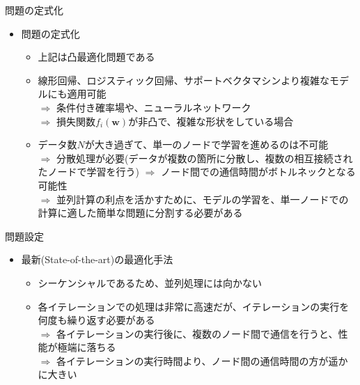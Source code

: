 \documentclass[dvipdfmx,notheorems,t]{beamer}
\begin{document}
\begin{frame}{問題の定式化}

\begin{itemize}
	\item 問題の定式化
	\begin{itemize}
		\item 上記は凸最適化問題である
		\newline
		
		\item 線形回帰、ロジスティック回帰、サポートベクタマシンより複雑なモデルにも適用可能 \\
		$\Rightarrow$ 条件付き確率場や、ニューラルネットワーク \\
		$\Rightarrow$ 損失関数$f_i(\bm{w})$が非凸で、複雑な形状をしている場合
		\newline
		
		\item データ数$N$が大き過ぎて、単一のノードで学習を進めるのは不可能 \\
		$\Rightarrow$ 分散処理が必要(データが複数の箇所に分散し、複数の相互接続されたノードで学習を行う) \newline \newline
		$\Rightarrow$ ノード間での通信時間がボトルネックとなる可能性 \\
		$\Rightarrow$ 並列計算の利点を活かすために、モデルの学習を、単一ノードでの計算に適した簡単な問題に分割する必要がある
	\end{itemize}
\end{itemize}

\end{frame}

\begin{frame}{問題設定}

\begin{itemize}
	\item 最新(State-of-the-art)の最適化手法
	\begin{itemize}
		\item シーケンシャルであるため、並列処理には向かない
		\newline
		
		\item 各イテレーションでの処理は非常に高速だが、イテレーションの実行を何度も繰り返す必要がある \\
		$\Rightarrow$ 各イテレーションの実行後に、複数のノード間で通信を行うと、性能が極端に落ちる \\
		$\Rightarrow$ 各イテレーションの実行時間より、ノード間の通信時間の方が遥かに大きい
	\end{itemize}
\end{itemize}

\end{frame}
\end{document}
